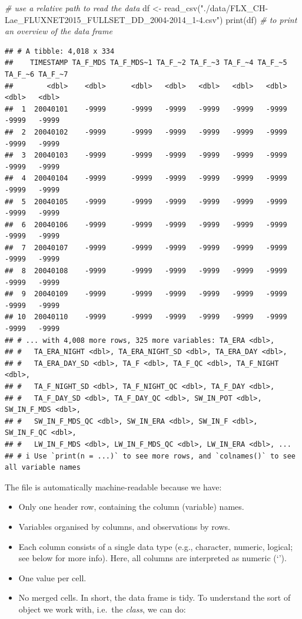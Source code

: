 \documentclass[
]{book}
\newenvironment{Shaded}{\begin{snugshade}}{\end{snugshade}}
\newcommand{\CommentTok}[1]{\textcolor[rgb]{0.56,0.35,0.01}{\textit{#1}}}
\newcommand{\FunctionTok}[1]{\textcolor[rgb]{0.00,0.00,0.00}{#1}}
\newcommand{\NormalTok}[1]{#1}
\newcommand{\OtherTok}[1]{\textcolor[rgb]{0.56,0.35,0.01}{#1}}
\newcommand{\StringTok}[1]{\textcolor[rgb]{0.31,0.60,0.02}{#1}}
\providecommand{\tightlist}{%
  \setlength{\itemsep}{0pt}\setlength{\parskip}{0pt}}
\begin{document}
\begin{Shaded}
\begin{Highlighting}[]
\CommentTok{\# use a relative path to read the data}
\NormalTok{df }\OtherTok{\textless{}{-}} \FunctionTok{read\_csv}\NormalTok{(}\StringTok{"./data/FLX\_CH{-}Lae\_FLUXNET2015\_FULLSET\_DD\_2004{-}2014\_1{-}4.csv"}\NormalTok{)}
\FunctionTok{print}\NormalTok{(df) }\CommentTok{\# to print an overview of the data frame}
\end{Highlighting}
\end{Shaded}

\begin{verbatim}
## # A tibble: 4,018 x 334
##    TIMESTAMP TA_F_MDS TA_F_MDS~1 TA_F_~2 TA_F_~3 TA_F_~4 TA_F_~5 TA_F_~6 TA_F_~7
##        <dbl>    <dbl>      <dbl>   <dbl>   <dbl>   <dbl>   <dbl>   <dbl>   <dbl>
##  1  20040101    -9999      -9999   -9999   -9999   -9999   -9999   -9999   -9999
##  2  20040102    -9999      -9999   -9999   -9999   -9999   -9999   -9999   -9999
##  3  20040103    -9999      -9999   -9999   -9999   -9999   -9999   -9999   -9999
##  4  20040104    -9999      -9999   -9999   -9999   -9999   -9999   -9999   -9999
##  5  20040105    -9999      -9999   -9999   -9999   -9999   -9999   -9999   -9999
##  6  20040106    -9999      -9999   -9999   -9999   -9999   -9999   -9999   -9999
##  7  20040107    -9999      -9999   -9999   -9999   -9999   -9999   -9999   -9999
##  8  20040108    -9999      -9999   -9999   -9999   -9999   -9999   -9999   -9999
##  9  20040109    -9999      -9999   -9999   -9999   -9999   -9999   -9999   -9999
## 10  20040110    -9999      -9999   -9999   -9999   -9999   -9999   -9999   -9999
## # ... with 4,008 more rows, 325 more variables: TA_ERA <dbl>,
## #   TA_ERA_NIGHT <dbl>, TA_ERA_NIGHT_SD <dbl>, TA_ERA_DAY <dbl>,
## #   TA_ERA_DAY_SD <dbl>, TA_F <dbl>, TA_F_QC <dbl>, TA_F_NIGHT <dbl>,
## #   TA_F_NIGHT_SD <dbl>, TA_F_NIGHT_QC <dbl>, TA_F_DAY <dbl>,
## #   TA_F_DAY_SD <dbl>, TA_F_DAY_QC <dbl>, SW_IN_POT <dbl>, SW_IN_F_MDS <dbl>,
## #   SW_IN_F_MDS_QC <dbl>, SW_IN_ERA <dbl>, SW_IN_F <dbl>, SW_IN_F_QC <dbl>,
## #   LW_IN_F_MDS <dbl>, LW_IN_F_MDS_QC <dbl>, LW_IN_ERA <dbl>, ...
## # i Use `print(n = ...)` to see more rows, and `colnames()` to see all variable names
\end{verbatim}

The file is automatically machine-readable because we have:

\begin{itemize}
\tightlist
\item
  Only one header row, containing the column (variable) names.
\item
  Variables organised by columns, and observations by rows.
\item
  Each column consists of a single data type (e.g., character, numeric, logical; see below for more info). Here, all columns are interpreted as numeric (`').
\item
  One value per cell.
\item
  No merged cells.
  In short, the data frame is tidy.
  To understand the sort of object we work with, i.e.~the \emph{class}, we can do:
\end{itemize}
\end{document}
